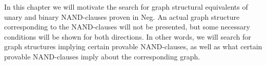 In this chapter we will motivate the search for graph structural equivalents of unary and binary NAND-clauses proven in Neg.
An actual graph structure corresponding to the NAND-clauses will not be presented, but some necessary conditions will be shown for both directions.
In other words, we will search for graph structures implying certain provable NAND-clauses, as well as what certain provable NAND-clauses imply about the corresponding graph.
